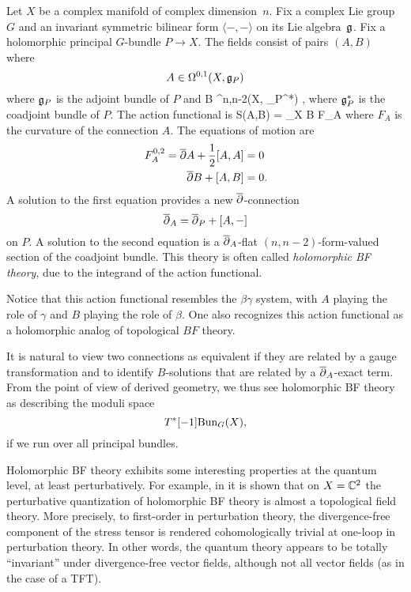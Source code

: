 \documentclass[11pt]{amsart}
\begin{document}
Let $X$ be a complex manifold of complex dimension~$n$.
Fix a complex Lie group $G$ and an invariant symmetric bilinear form $\langle-,-\rangle$ on its Lie algebra~$\mathfrak g$.
Fix a holomorphic principal $G$-bundle $P \to X$.
The fields consist of pairs $(A,B)$ where 
\[
A \in \Omega^{0,1}(X, \mathfrak g_P)
\] 
where $\mathfrak g_P$ is the adjoint bundle of $P$ and
\beqn
B \in \Omega^{n,n-2}(X, \fg_P^*) ,
\eeqn
where $\mathfrak g_P^*$ is the coadjoint bundle of $P$. 
The action functional is 
\beqn
S(A,B) = \int_X \langle B \wedge F_A \rangle
\eeqn
where $F_A$ is the curvature of the connection $A$.
The equations of motion are
\begin{align*}
F_A^{0,2} = {\overline{\partial}} A + \frac12 [A,A] & = 0 \\
 {\overline{\partial}} B + [A,B] & = 0.
\end{align*}
A solution to the first equation provides a new ${\overline{\partial}}$-connection 
\[
{\overline{\partial}}_A = {\overline{\partial}}_P + [A,-] 
\]
on $P$.
A solution to the second equation is a ${\overline{\partial}}_A$-flat $(n,n-2)$-form-valued section of the coadjoint bundle.
This theory is often called {\em holomorphic BF theory}, due to the integrand of the action functional.

\begin{rmk}
Notice that this action functional resembles the $\beta\gamma$ system, 
with $A$ playing the role of $\gamma$ and $B$ playing the role of $\beta$.
One also recognizes this action functional as a holomorphic analog of topological $BF$ theory. 
\end{rmk}

It is natural to view two connections as equivalent if they are related by a gauge transformation
and to identify $B$-solutions that are related by a ${\overline{\partial}}_A$-exact term.
From the point of view of derived geometry,
we thus see holomorphic BF theory as describing the moduli space
\[
T^*[-1] {\rm Bun}_G(X),
\]
if we run over all principal bundles.

\begin{rmk}
Holomorphic BF theory exhibits some interesting properties at the quantum level,
at least perturbatively.
For example, in \cite[\S3.2]{BGKWWY} it is shown that on $X = {\mathbb{C}}^2$ 
the perturbative quantization of holomorphic BF theory is almost a topological field theory. 
More precisely, to first-order in perturbation theory, 
the divergence-free component of the stress tensor is rendered cohomologically trivial at one-loop in perturbation theory.
In other words, the quantum theory appears to be totally ``invariant'' under divergence-free vector fields,
although not all vector fields (as in the case of a TFT).
\end{rmk}
\end{document}
